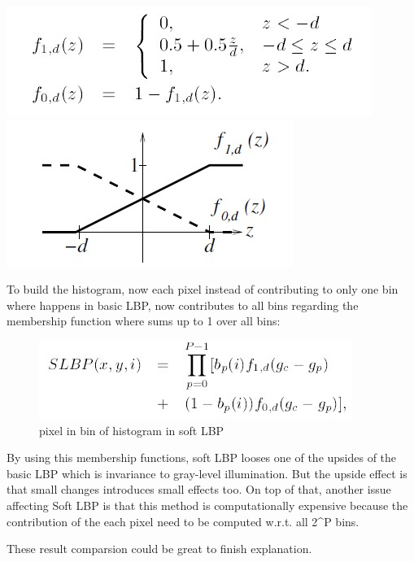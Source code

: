 \documentclass[11pt]{article}
\makeatletter
\def\maxwidth{\ifdim\Gin@nat@width>\linewidth\linewidth
    \else\Gin@nat@width\fi}
\let\Oldincludegraphics\includegraphics
\renewcommand{\includegraphics}[1]{\Oldincludegraphics[width=.8\maxwidth]{#1}}
\makeatother
\begin{document}
\includegraphics{wiki/3_2_4.jpg} \includegraphics{wiki/3_2_6.jpg}

To build the histogram, now each pixel instead of contributing to only
one bin where happens in basic LBP, now contributes to all bins
regarding the membership function where sums up to 1 over all bins:

\begin{figure}
\centering
\includegraphics{wiki/3_2_5.jpg}
\caption{pixel in bin of histogram in soft LBP}
\end{figure}

By using this membership functions, soft LBP looses one of the upsides
of the basic LBP which is invariance to gray-level illumination. But the
upside effect is that small changes introduces small effects too. On top
of that, another issue affecting Soft LBP is that this method is
computationally expensive because the contribution of the each pixel
need to be computed w.r.t. all 2\^{}P bins.

These result comparsion could be great to finish explanation.
\end{document}
